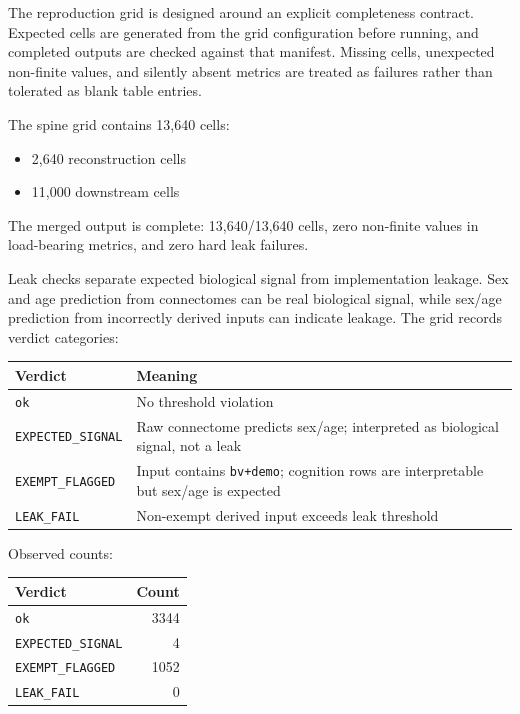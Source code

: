 The reproduction grid is designed around an explicit completeness contract. Expected cells are generated from the grid configuration before running, and completed outputs are checked against that manifest. Missing cells, unexpected non-finite values, and silently absent metrics are treated as failures rather than tolerated as blank table entries.

The spine grid contains 13,640 cells:

\begin{itemize}
\tightlist
\item
  2,640 reconstruction cells
\item
  11,000 downstream cells
\end{itemize}

The merged output is complete: 13,640/13,640 cells, zero non-finite values in load-bearing metrics, and zero hard leak failures.

Leak checks separate expected biological signal from implementation leakage. Sex and age prediction from connectomes can be real biological signal, while sex/age prediction from incorrectly derived inputs can indicate leakage. The grid records verdict categories:

{\def\LTcaptype{none} %
\begin{longtable}[]{@{}ll@{}}
\toprule\noalign{}
Verdict & Meaning \\
\midrule\noalign{}
\endhead
\bottomrule\noalign{}
\endlastfoot
\texttt{ok} & No threshold violation \\
\texttt{EXPECTED\_SIGNAL} & Raw connectome predicts sex/age; interpreted as biological signal, not a leak \\
\texttt{EXEMPT\_FLAGGED} & Input contains \texttt{bv+demo}; cognition rows are interpretable but sex/age is expected \\
\texttt{LEAK\_FAIL} & Non-exempt derived input exceeds leak threshold \\
\end{longtable}
}

Observed counts:

{\def\LTcaptype{none} %
\begin{longtable}[]{@{}lr@{}}
\toprule\noalign{}
Verdict & Count \\
\midrule\noalign{}
\endhead
\bottomrule\noalign{}
\endlastfoot
\texttt{ok} & 3344 \\
\texttt{EXPECTED\_SIGNAL} & 4 \\
\texttt{EXEMPT\_FLAGGED} & 1052 \\
\texttt{LEAK\_FAIL} & 0 \\
\end{longtable}
}

